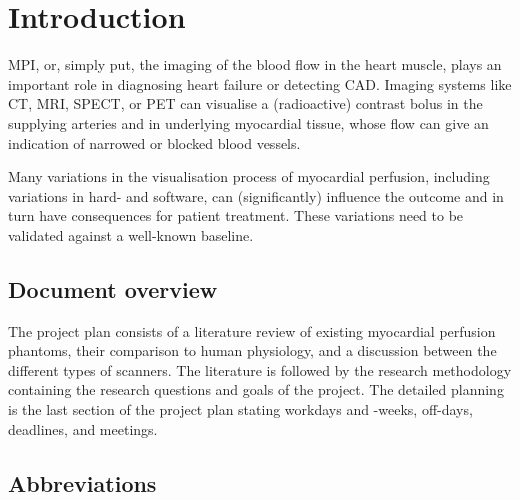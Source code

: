 \chapter{Introduction}
\label{ch:Intro}


\Ac{MPI}, or, simply put, the imaging of the blood flow in the heart muscle, plays an important role in diagnosing heart failure or detecting \ac{CAD}. Imaging systems like \ac{CT}, \ac{MRI}, \ac{SPECT}, or \ac{PET} can visualise a (radioactive) contrast bolus in the supplying arteries and in underlying myocardial tissue, whose flow can give an indication of narrowed or blocked blood vessels.

Many variations in the visualisation process of myocardial perfusion, including variations in hard- and software, can (significantly) influence the outcome and in turn have consequences for patient treatment. These variations need to be validated against a well-known baseline.

\section*{Document overview}
\label{sec:doc_overview}
The project plan consists of a literature review of existing myocardial perfusion phantoms, their comparison to human physiology, and a discussion between the different types of scanners. The literature is followed by the research methodology containing the research questions and goals of the project. The detailed planning is the last section of the project plan stating workdays and -weeks, off-days, deadlines, and meetings.

\section*{Abbreviations}
\begin{multicols}{2}
	\printacronyms[include-classes=abbrev, name=Abbreviations, heading=none]
\end{multicols}
